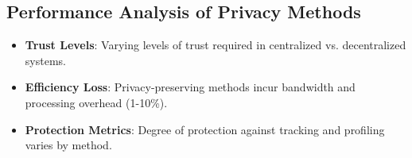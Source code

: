 \documentclass{article}
\begin{document}
\subsection{Performance Analysis of Privacy Methods}
\begin{itemize}
  \item \textbf{Trust Levels}: Varying levels of trust required in centralized vs. decentralized systems.
  \item \textbf{Efficiency Loss}: Privacy-preserving methods incur bandwidth and processing overhead (1-10\%).
  \item \textbf{Protection Metrics}: Degree of protection against tracking and profiling varies by method.
\end{itemize}
\end{document}
